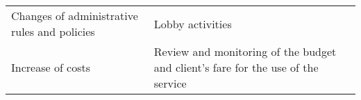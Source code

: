 \begin{longtable}{ll}
\begin{minipage}[t]{0.45\textwidth}
\end{minipage} \\ \hline
\begin{minipage}[t]{0.5\textwidth}
Changes of administrative rules and policies
\end{minipage} &
\begin{minipage}[t]{0.45\textwidth}
Lobby activities
\end{minipage} \\ \hline
\begin{minipage}[t]{0.5\textwidth}
Increase of costs
\end{minipage} &
\begin{minipage}[t]{0.45\textwidth}
Review and monitoring of the budget and client’s fare for the use of the service
\end{minipage} \\ \hline
\end{longtable}



